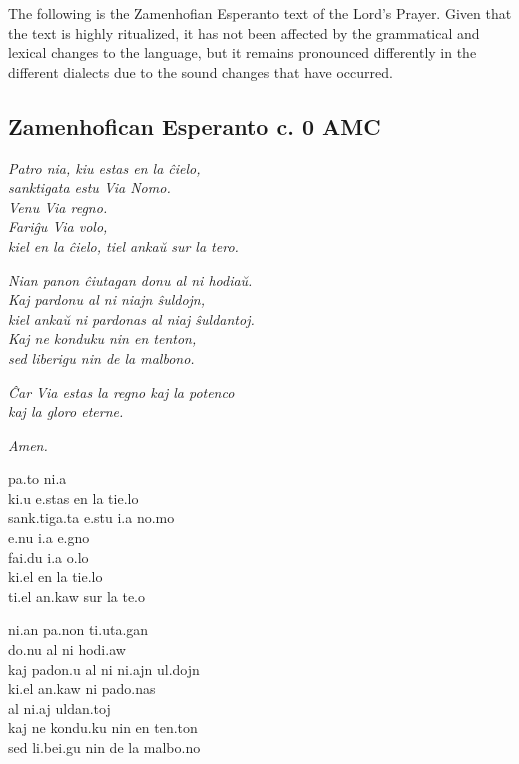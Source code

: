 The following is the Zamenhofian Esperanto text of the Lord's Prayer. Given that the text is highly ritualized, it has not been affected by the grammatical and lexical changes to the language, but it remains pronounced differently in the different dialects due to the sound changes that have occurred.

\subsection{Zamenhofican Esperanto c. 0 AMC}

\begin{multicols*}{2}
    \textit{Patro nia, kiu estas en la ĉielo, \\
    sanktigata estu Via Nomo. \\
    Venu Via regno. \\
    Fariĝu Via volo, \\
    kiel en la ĉielo, tiel ankaŭ sur la tero.}

    \textit{Nian panon ĉiutagan donu al ni hodiaŭ. \\
    Kaj pardonu al ni niajn ŝuldojn, \\
    kiel ankaŭ ni pardonas al niaj ŝuldantoj. \\
    Kaj ne konduku nin en tenton, \\
    sed liberigu nin de la malbono.}

    \textit{Ĉar Via estas la regno 
    kaj la potenco \\
    kaj la gloro eterne.}

    \textit{Amen.}
    
    \columnbreak

    \prstr pa.t\alvrap o \prstr ni.a\\
    \prstr ki.u \prstr e.stas en la t\tiebar\esh i\prstr e.lo\\
    \scstr sank.ti\prstr ga.ta \prstr e.stu \prstr \labrox i.a \prstr no.mo\\
    \prstr\labrox e.nu \prstr\labrox i.a \prstr\alvrap e.gno\\
    fa\prstr\alvrap i.d\tiebar\ezh u \prstr\labrox i.a \prstr\labrox o.lo\\
    \prstr ki.el en la t\tiebar\esh i\prstr e.lo\\
    \prstr ti.el \prstr an.kaw sur la \prstr te.\alvrap o

    \prstr ni.an \prstr pa.non \scstr t\tiebar\esh i.u\prstr ta.gan\\
    \prstr do.nu al ni ho\prstr di.aw\\
    kaj pa\alvrap\prstr don.u al ni \prstr ni.ajn \prstr\esh ul.dojn\\
    \prstr ki.el \prstr an.kaw ni pa\alvrap\prstr do.nas\\
    al \prstr ni.aj \esh ul\prstr dan.toj\\
    kaj ne kon\prstr du.ku nin en \prstr ten.ton\\
    sed \scstr li.be\prstr\alvrap i.gu nin de la mal\prstr bo.no


\end{multicols*}
